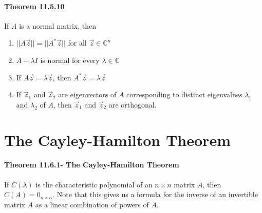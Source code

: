 \documentclass[10pt,letter]{article}
\begin{document}
\paragraph{Theorem 11.5.10}
If $A$ is a normal matrix, then 
\begin{enumerate}
    \item $||A\vec{z}||=||A^*\vec{z}||$ for all $\vec{z}\in\mathbb{C}^n$ 
    \item $A-\lambda I$ is normal for every $\lambda \in \mathbb{C}$ 
    \item If $A\vec{z}=\lambda\vec{z}$, then $A^*\vec{z}=\overline{\lambda}\vec{z}$ 
    \item If $\vec{z}_1$ and $\vec{z}_2$ are eigenvectors of $A$ corresponding to distinct eigenvalues $\lambda_1$ and $\lambda_2$ of $A$, then $\vec{z}_1$ and $\vec{z}_2$ are orthogonal. 
\end{enumerate}


\section*{The Cayley-Hamilton Theorem}
\paragraph{Theorem 11.6.1- The Cayley-Hamilton Theorem}
If $C(\lambda)$ is the characteristic polynomial of an $n\times n$ matrix $A$, then $C(A)=0_{n\times n}$. Note that this gives us a formula for the inverse of an invertible matrix $A$ as a linear combination of powers of $A$. 
\end{document}
